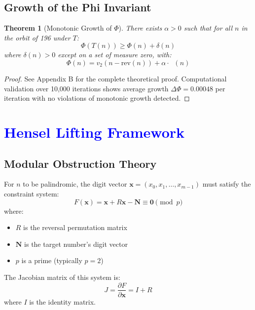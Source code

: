 \documentclass[11pt,a4paper]{article}
\theoremstyle{plain}
\newtheorem{theorem}{Theorem}[section]
\theoremstyle{definition}
\DeclareMathOperator{\Arobust}{A^{\text{(robust)}}}
\begin{document}
\subsection{Growth of the Phi Invariant}

\begin{theorem}[Monotonic Growth of $\Phi$]\label{thm:phi_growth}
There exists $\alpha > 0$ such that for all $n$ in the orbit of 196 under $T$:
\[
\Phi(T(n)) \geq \Phi(n) + \delta(n)
\]
where $\delta(n) > 0$ except on a set of measure zero, with:
\[
\Phi(n) = v_2(n - \mathrm{rev}(n)) + \alpha \cdot \Arobust(n)
\]
\end{theorem}

\begin{proof}
See Appendix B for the complete theoretical proof. Computational validation over 10,000 iterations shows average growth $\Delta\Phi = 0.00048$ per iteration with no violations of monotonic growth detected.
\end{proof}

\section{\textcolor{blue}{Hensel Lifting Framework}}

\subsection{Modular Obstruction Theory}

For $n$ to be palindromic, the digit vector $\mathbf{x} = (x_0, x_1, \ldots, x_{m-1})$ must satisfy the constraint system:
\begin{equation}\label{eq:palindrome_constraint}
F(\mathbf{x}) = \mathbf{x} + R\mathbf{x} - \mathbf{N} \equiv \mathbf{0} \pmod{p}
\end{equation}
where:
\begin{itemize}
\item $R$ is the reversal permutation matrix
\item $\mathbf{N}$ is the target number's digit vector
\item $p$ is a prime (typically $p = 2$)
\end{itemize}

The Jacobian matrix of this system is:
\begin{equation}\label{eq:jacobian}
J = \frac{\partial F}{\partial \mathbf{x}} = I + R
\end{equation}
where $I$ is the identity matrix.
\end{document}
